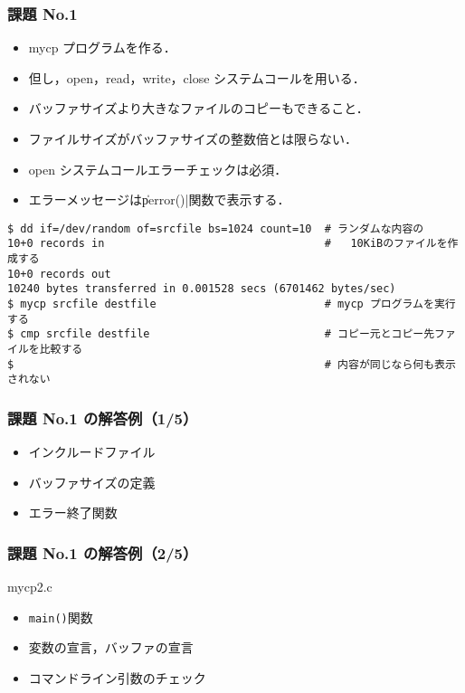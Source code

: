 \documentclass{beamer}                 %
\begin{document}
\begin{frame}[fragile]
\frametitle{課題 No.1}
\begin{itemize}
\item mycp プログラムを作る．
\item 但し，open，read，write，close システムコールを用いる．
\item バッファサイズより大きなファイルのコピーもできること．
\item ファイルサイズがバッファサイズの整数倍とは限らない．
\item open システムコールエラーチェックは必須．
\item エラーメッセージは\|perror()|関数で表示する．
\end{itemize}

\begin{lstlisting}[numbers=none]
$ dd if=/dev/random of=srcfile bs=1024 count=10  # ランダムな内容の
10+0 records in                                  #   10KiBのファイルを作成する
10+0 records out
10240 bytes transferred in 0.001528 secs (6701462 bytes/sec)
$ mycp srcfile destfile                          # mycp プログラムを実行する
$ cmp srcfile destfile                           # コピー元とコピー先ファイルを比較する
$                                                # 内容が同じなら何も表示されない
\end{lstlisting}
\end{frame}

\begin{frame}[fragile]
  \frametitle{課題 No.1 の解答例（1/5）}
  \begin{itemize}
    \item インクルードファイル
    \item バッファサイズの定義
    \item エラー終了関数
  \end{itemize}
\end{frame}

\begin{frame}[fragile]
  \frametitle{課題 No.1 の解答例（2/5）}
      {mycp2.c}
  \begin{itemize}
    \item \texttt{main()}関数
    \item 変数の宣言，バッファの宣言
    \item コマンドライン引数のチェック
  \end{itemize}
\end{frame}
\end{document}
